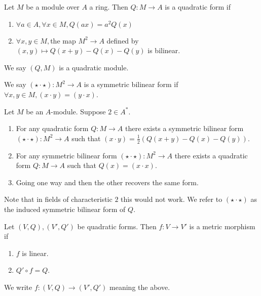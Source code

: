 \begin{dfn}
    Let $M$ be a module over $A$ a ring.
    Then $Q : M \to A$ is a quadratic form if
    \begin{enumerate}
        \item $\forall a \in A, \forall x \in M, Q(a x) = a^2 Q(x)$
        \item $\forall x,y \in M,$the map $M^2 \to A$ defined by 
        $(x,y) \mapsto Q(x + y) - Q(x) - Q(y)$ is bilinear.
    \end{enumerate}
    We say $(Q,M)$ is a quadratic module.

    We say $(\star \cdot \star): M^2 \to A$ 
    is a symmetric bilinear form if 
    $\forall x, y \in M, 
    (x \cdot y) = (y \cdot x)$.
\end{dfn}

\begin{prop}
    Let $M$ be an $A$-module.
    Suppose $2 \in A^*$.
    \begin{enumerate}
        \item For any quadratic form $Q : M \to A$ 
        there exists a symmetric bilinear form 
        $(\star \cdot \star): M^2 \to A$
        such that $(x \cdot y) = 
        \frac{1}{2} (Q(x + y) - Q(x) - Q(y))$.
        \item For any symmetric bilinear form 
        $(\star \cdot \star): M^2 \to A$ 
        there exists a quadratic form $Q : M \to A$ 
        such that $Q(x) = (x \cdot x)$.
        \item Going one way and then the other 
        recovers the same form.
    \end{enumerate}
    Note that in fields of characteristic $2$ 
    this would not work.
    We refer to $(\star\cdot\star)$ 
    as the induced symmetric bilinear form of $Q$.
\end{prop}

\begin{dfn}
    Let $(V,Q),(V',Q')$ be quadratic forms.
    Then $f : V \to V'$ is a metric morphism if
    \begin{enumerate}
        \item $f$ is linear.
        \item $Q' \circ f = Q$.
    \end{enumerate}
    We write $f : (V,Q) \to (V',Q')$ meaning the above.
\end{dfn}

